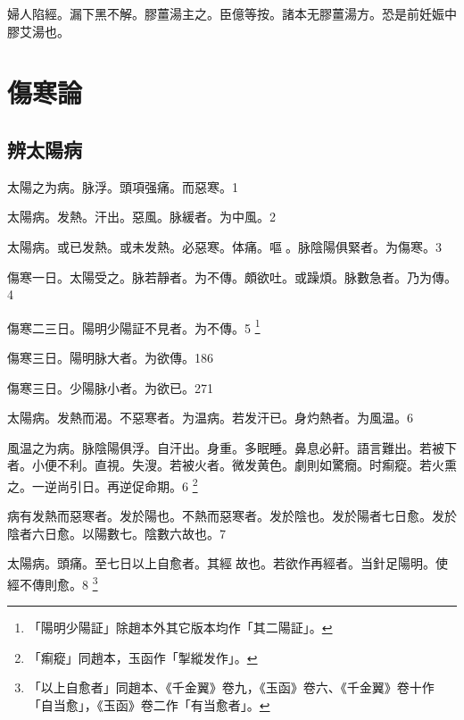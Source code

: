 婦人陷經。漏下黑不解。膠薑湯主之。{\scriptsize 臣億等按。諸本无膠薑湯{\khaaitp 方}。恐是前妊娠中膠艾湯也。}

\part{傷寒論}

\chapter{辨太陽病}

太陽之为病。{\khaaitp 脉浮。}頭項强痛。而惡寒。1

太陽病。发熱。汗出。惡風。脉緩者。为中風。2

%

太陽病。或已发熱。或未发熱。必惡寒。体痛。嘔{\sungtpii 𠱘}。脉陰陽俱緊者。为傷寒。3


傷寒一日。太陽受之。脉若靜者。为不傳。頗欲吐。或躁煩。脉數急者。乃为傳。4

傷寒{\khaaitp 二三日}。陽明少陽証不見者。为不傳。5
	\footnote{
		「陽明少陽証」除趙本外其它版本均作「其二陽証」。
	}

傷寒三日。陽明脉大{\khaaitp 者。为欲傳}。186

傷寒三日。少陽脉小者。为欲已。271


太陽病。发熱而渴。不惡寒者。为温病。若发汗已。身灼熱者。为風温。6

風温{\khaaitp 之}为病。脉陰陽俱浮。自汗出。身重。多眠睡。鼻息必鼾。語言難出。若被下者。小便不利。直視。失溲。若被火者。微发黄{\khaaitp 色}。劇則如驚癇。时痸瘲。若火熏之。一逆尚引日。再逆促命期。6
	\footnote{
		「痸瘲」同趙本，玉函作「掣縱发作」。
	}

病有发熱而惡寒者。发於陽也。不熱而惡寒者。发於陰也。发於陽者七日愈。发於陰者六日愈。以陽數七。陰數六故也。7

太陽病。頭痛。至七日以上自愈者。其經{\sungtpii 𥁞}故也。若欲作再經者。当針足陽明。使經不傳則愈。8
	\footnote{
		「以上自愈者」同趙本、《千金翼》卷九，《玉函》卷六、《千金翼》卷十作「自当愈」，《玉函》卷二作「有当愈者」。
	}

